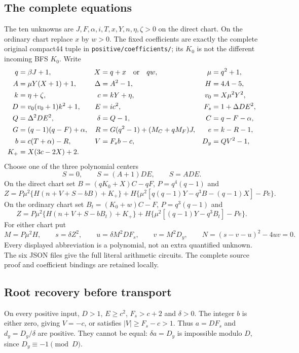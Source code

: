 \subsection{The complete equations}
The ten unknowns are $J,F,\alpha,i,T,x,Y,n,\eta,\zeta>0$ on the direct chart. On the ordinary chart replace $x$ by $w>0$. The fixed coefficients are exactly the complete original compact44 tuple in \texttt{positive/coefficients/}; its $K_0$ is not the different incoming BFS $K_0$. Write
\begin{align*}
q&=\beta J+1,&X&=q+x\quad\hbox{or}\quad qw,&\mu&=q^2+1,\\
A&=\mu Y(X+1)+1,&\Delta&=A^2-1,&H&=4A-5,\\
k&=\eta+\zeta,&c&=kY+\eta,&v_0&=X\mu^2Y^2,\\
D&=v_0(v_0+1)k^2+1,&E&=ic^2,&F_s&=1+\Delta DE^2,\\
Q&=\Delta^2DE^2,&\delta&=Q-1,&C&=q-F-\alpha,\\
G&=(q-1)(q-F)+\alpha,&R&=G(q^2-1)+(M_C+qM_F)J,&e&=k-R-1,\\
b&=c(T+\alpha)-R,&V&=F_sb-c,&D_y&=QV^2-1,\\
K_+&=X(3c-2X)+2.
\end{align*}
Choose one of the three polynomial centers
\[
 S=0,\qquad S=(A+1)DE,\qquad S=ADE.
\]
On the direct chart set $B=(qK_0+X)C-qF$, $P=q^4(q-1)$ and
\[
 Z=P\mu^2\{H(n+V+S-bB)+K_+\}
 +H\{\mu^2[q(q-1)Y-q^3B-(q-1)X]-Pe\}.
\]
On the ordinary chart set $B_t=(K_0+w)C-F$, $P=q^3(q-1)$ and
\[
 Z=P\mu^2\{H(n+V+S-bB_t)+K_+\}
 +H\{\mu^2[(q-1)Y-q^3B_t]-Pe\}.
\]
For either chart put
\[
 M=P\mu^2H,\qquad s=\delta Z^2,\qquad
 u=\delta M^2DF_s,\qquad v=M^2D_y,
 \qquad \boxed{N=(s-v-u)^2-4uv=0.}
\]
Every displayed abbreviation is a polynomial, not an extra quantified unknown. The six JSON files give the full literal arithmetic circuits. The complete source proof and coefficient bindings are retained locally.

\subsection{Root recovery before transport}
On every positive input, $D>1$, $E\ge c^2$, $F_s>c+2$ and $\delta>0$. The integer $b$ is either zero, giving $V=-c$, or satisfies $|V|\ge F_s-c>1$. Thus $a=DF_s$ and $d_y=D_y/\delta$ are positive. They cannot be equal: $\delta a=D_y$ is impossible modulo $D$, since $D_y\equiv-1\pmod D$.

